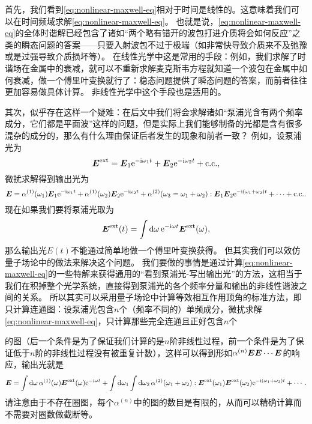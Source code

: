 \documentclass[UTF8, a4paper]{ctexart}
\newcommand*{\ee}{\mathrm{e}}
\newcommand*{\ii}{\mathrm{i}}
\begin{document}
首先，我们看到\eqref{eq:nonlinear-maxwell-eq}相对于时间是线性的。这意味着我们可以在时间频域求解\eqref{eq:nonlinear-maxwell-eq}。
也就是说，\eqref{eq:nonlinear-maxwell-eq}的全体时谐解已经包含了诸如“两个略有错开的波包打进介质将会如何反应”之类的瞬态问题的答案——只要入射波包不过于极端（如非常快导致介质来不及弛豫或是过强导致介质损坏等）。
在线性光学中这是常用的手段：例如，我们求解了时谐场在金属中的衰减，就可以不重新求解麦克斯韦方程就知道一个波包在金属中如何衰减，做一个傅里叶变换就行了：稳态问题提供了瞬态问题的答案，而前者往往更加容易做具体计算。
非线性光学中这个手段也是适用的。

其次，似乎存在这样一个疑难：在后文中我们将会求解诸如“泵浦光含有两个频率成分，它们都是平面波”这样的问题，但是实际上我们能够制备的光都是含有很多混杂的成分的，那么有什么理由保证后者发生的现象和前者一致？
例如，设泵浦光为
\[
    \vb*{E}^\text{ext} = \vb*{E}_1 \ee^{-\ii \omega_1 t} + \vb*{E}_2 \ee^{-\ii \omega_2 t} + \text{c.c.},
\]
微扰求解得到输出光为
\[
    \vb*{E} = \alpha^{(1)}(\omega_1) \vb*{E}_1 \ee^{-\ii \omega_1 t} + \alpha^{(1)}(\omega_2) \vb*{E}_2 \ee^{-\ii \omega_2 t} + \alpha^{(2)}(\omega_3 = \omega_1 + \omega_2) : \vb*{E}_1 \vb*{E}_2 \ee^{-\ii (\omega_1 + \omega_2) t} + \cdots + \text{c.c.}.
\]
现在如果我们要将泵浦光取为
\[
    \vb*{E}^\text{ext}(t) = \int \dd{\omega} \ee^{-\ii \omega t} \vb*{E}^\text{ext}(\omega),
\]
那么输出光$E(t)$不能通过简单地做一个傅里叶变换获得。
但其实我们可以效仿量子场论中的做法来解决这个问题。
我们要做的事情是通过计算\eqref{eq:nonlinear-maxwell-eq}的一些特解来获得通用的“看到泵浦光-写出输出光”的方法，这相当于我们在积掉整个光学系统，直接得到泵浦光的各个频率分量和输出的非线性谐波之间的关系。
所以其实可以采用量子场论中计算等效相互作用顶角的标准方法，即只计算连通图：设泵浦光包含$n$个（频率不同的）单频成分，微扰求解\eqref{eq:nonlinear-maxwell-eq}，只计算那些完全连通且正好包含$n$个的图（后一个条件是为了保证我们计算的是$n$阶非线性过程，前一个条件是为了保证低于$n$阶的非线性过程没有被重复计数），这样可以得到形如$\alpha^{(n)} \vb*{E} \vb*{E} \cdots \vb*{E}$的响应，输出光就是
\[
    \vb*{E} = \int \dd{\omega} \alpha^{(1)}(\omega) \vb*{E}^\text{ext}(\omega) \ee^{-\ii \omega t} + \int \dd{\omega_1} \int \dd{\omega_2} \alpha^{(2)}(\omega_1 + \omega_2) : \vb*{E}^\text{ext}(\omega_1) \vb*{E}^\text{ext}(\omega_2) \ee^{-\ii (\omega_1 + \omega_2) t} + \cdots.
\]
请注意由于不存在圈图，每个$\alpha^{(n)}$中的图的数目是有限的，从而可以精确计算而不需要对圈数做截断等。
\end{document}
